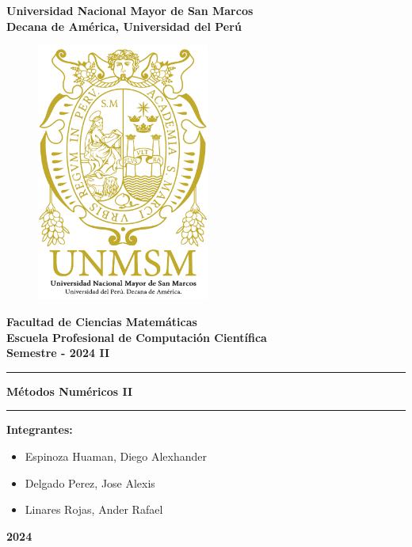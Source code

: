 \begin{titlepage}
  \rmfamily
  \begin{center}
  \LARGE\textbf{Universidad Nacional Mayor de San Marcos}\\
  \vspace{2.5mm}
  \large\textbf{Decana de América, Universidad del Perú}\\
  \vspace{2.5mm}
  \begin{figure}[H]
    \centering
    \includegraphics[height=8.5cm]{src/include/logo.png}
  \end{figure}
  \Large\textbf{Facultad de Ciencias Matemáticas}\\
  \vspace{2.5mm}
  \large\textbf{Escuela Profesional de Computación Científica}\\
  \vspace{2.5mm}
  \large\textbf{Semestre - 2024 II}\\
  \rule{\linewidth}{0.55mm}
  \Large\textbf{Métodos Numéricos II}\\
  \rule{\linewidth}{0.55mm}
  \vspace{2.5mm}
  \large\textbf{Integrantes:}\\
  \vspace{2.5mm}
  \begin{itemize}
    \normalsize
    \item Espinoza Huaman, Diego Alexhander
    \item Delgado Perez, Jose Alexis
    \item Linares Rojas, Ander Rafael
  \end{itemize}
  \vfill
  {\huge\textbf{2024}}
  \end{center}
\end{titlepage}
